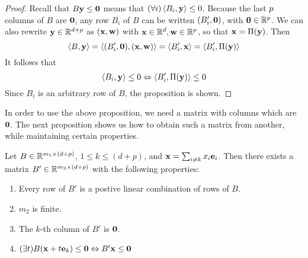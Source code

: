 \begin{proof}
	Recall that $B\mathbf{y} \leq \mathbf{0}$ means that $(\forall i)\left\langle B_i, \mathbf{y} \right\rangle \leq 0$.  Because the last $p$ columns of $B$ are $\mathbf{0}$, any row $B_i$ of $B$ can be written $(B'_i,\mathbf{0})$, with $\mathbf{0} \in \mathbb{R}^p$.  We can also rewrite $\mathbf{y}\in\mathbb{R}^{d+p}$ as $(\mathbf{x},\mathbf{w})$ with $\mathbf{x}\in\mathbb{R}^d,\mathbf{w}\in\mathbb{R}^p$, so that $\mathbf{x} = \Pi(\mathbf{y})$.  Then
	\[ \left\langle B, \mathbf{y} \right\rangle = \left\langle (B'_i,\mathbf{0}), (\mathbf{x},\mathbf{w}) \right\rangle = \left\langle B'_i, \mathbf{x} \right\rangle = \left\langle B'_i, \Pi(\mathbf{y}) \right\rangle \]
	It follows that
	\[ \left\langle B_i, \mathbf{y} \right\rangle \leq 0 \Leftrightarrow \left\langle B'_i, \Pi(\mathbf{y}) \right\rangle \leq 0 \]
	Since $B_i$ is an arbitrary row of $B$, the proposition is shown.
\end{proof}

In order to use the above proposition, we need a matrix with columns which are $\mathbf{0}$.  The next proposition shows us how to obtain such a matrix from another, while maintaining certain properties.

\begin{Prop}\label{fm_hcone}
	Let $B \in \mathbb{R}^{m_1\times (d+p)}$, $1 \leq k \leq (d+p)$, and $\mathbf{x} = \sum_{i\neq k}x_i \mathbf{e}_i$.  Then there exists a matrix $B' \in \mathbb{R}^{m_2\times (d+p)}$ with the following properties:
	\begin{enumerate}
		\item Every row of $B'$ is a postive linear combination of rows of $B$.
		\item $m_2$ is finite.
		\item The $k$-th column of $B'$ is $\mathbf{0}$.
		\item \((\exists t)B(\mathbf{x} + t\mathbf{e}_k) \leq \mathbf{0} \Leftrightarrow B'\mathbf{x} \leq \mathbf{0}\)
	\end{enumerate}
\end{Prop}

